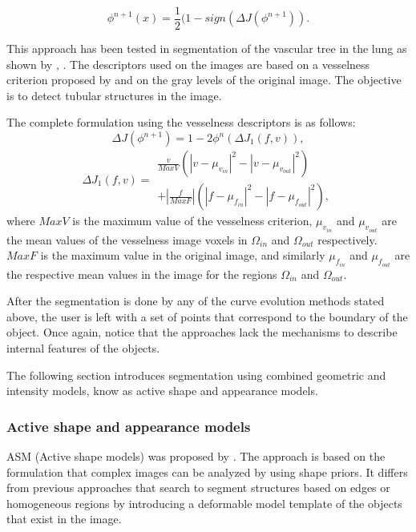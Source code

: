 \begin{equation}
 \phi^{n+1}(x) = \frac{1}{2}(1-sign\left(\Delta J(\phi^{n+1})\right).
\end{equation}

This approach has been tested in segmentation of the vascular tree in the lung as shown by \cite{PRIE-12c}, \cite{PRIE-12e}.
The descriptors used on the images are based on a vesselness criterion proposed by \cite{springerlink:10.1007/BFb0029240} and on the gray levels of the original image.
The objective is to detect tubular structures in the image.

The complete formulation using the vesselness descriptors is as follows:
\begin{equation}
  \Delta{J(\phi^{n+1})} = 1 - 2\phi^{n}\left(\Delta{J_{1}}(f, v)\right),
\end{equation}
\begin{equation}
  \Delta{J_{1}}(f, v) = \begin{array}{l}
                         \frac{v}{MaxV} \left( |v - \mu_{v_{in}}|^2 - |v - \mu_{v_{out}}|^2 \right)   \\
			+  \left|\frac{f}{MaxF}\right| \left(|f - \mu_{f_{in}}|^2 - |f - \mu_{f_{out}}|^2 \right),
                        \end{array}
\end{equation}
where $MaxV$ is the maximum value of the vesselness criterion, $\mu_{v_{in}}$ and $\mu_{v_{out}}$ 
are the mean values of the vesselness image voxels in $\Omega_{in}$ and $\Omega_{out}$ respectively. 
$MaxF$ is the maximum value in the original image, and similarly $\mu_{f_{in}}$ and $\mu_{f_{out}}$ are the respective mean values in the image 
for the regions $\Omega_{in}$ and $\Omega_{out}$.

After the segmentation is done by any of the curve evolution methods stated above, 
the user is left with a set of points that correspond to the boundary of the object. 
Once again, notice that the approaches lack the mechanisms to describe internal features of the objects.

The following section introduces segmentation using combined geometric and intensity models, know as active shape and appearance models. 

\subsubsection{Active shape and appearance models} 

ASM (Active shape models) was proposed by \cite{cootes1995active}. 
The approach is based on the formulation that complex images can be analyzed by using 
shape priors. 
It differs from previous approaches that search to segment structures based 
on edges or homogeneous regions by introducing a deformable model template of the
objects that exist in the image. 

